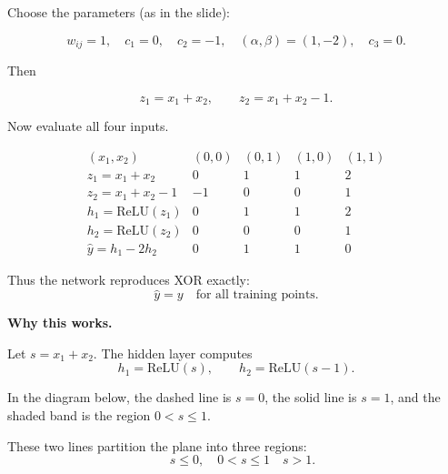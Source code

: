Choose the parameters (as in the slide):

\[
w_{ij}=1,
\quad
c_1 = 0,
\quad
c_2 = -1,
\quad
(\alpha,\beta) = (1,-2),
\quad
c_3 = 0.
\]

Then

\[
z_1 = x_1 + x_2,
\qquad
z_2 = x_1 + x_2 - 1.
\]

Now evaluate all four inputs.

\[
\begin{array}{c|cccc}
(x_1,x_2) 
& (0,0) & (0,1) & (1,0) & (1,1) \\ \hline
z_1 = x_1+x_2 
& 0 & 1 & 1 & 2 \\[4pt]
z_2 = x_1+x_2-1 
& -1 & 0 & 0 & 1 \\[4pt]
h_1 = \mathrm{ReLU}(z_1) 
& 0 & 1 & 1 & 2 \\[4pt]
h_2 = \mathrm{ReLU}(z_2) 
& 0 & 0 & 0 & 1 \\[4pt]
\hat y = h_1 - 2h_2 
& 0 & 1 & 1 & 0
\end{array}
\]

\bigskip

Thus the network reproduces XOR exactly:
\[
\hat y = y
\quad\text{for all training points.}
\]

\bigskip

\textbf{Why this works.}

Let $s = x_1 + x_2$.  
The hidden layer computes
\[
h_1 = \mathrm{ReLU}(s),
\qquad
h_2 = \mathrm{ReLU}(s-1).
\]

In the diagram below, the dashed line is $s=0$, the solid line is $s=1$, and the shaded band is the region $0 < s \le 1$.  

These two lines partition the plane into three regions:
\[
\quad s \le 0, \quad 0 < s \le 1 \quad s > 1.
\]

\medskip

